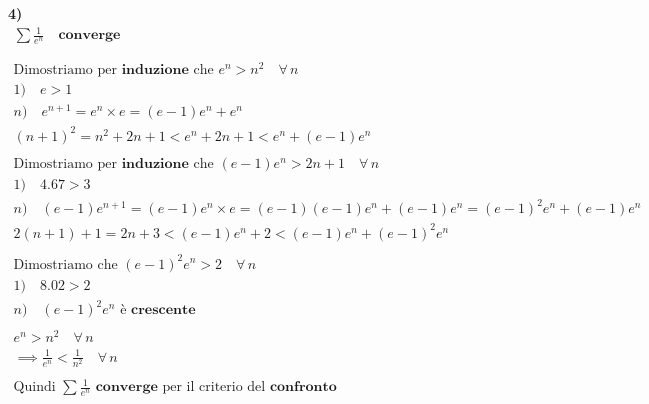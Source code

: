\documentclass[11pt,reqno]{amsart}
\begin{document}
{\bf 4)}
\begin{gather*}
  \sum \frac{1}{e^n} \quad \textbf{converge}\\\\\\
  \text{Dimostriamo per } \textbf{induzione} \text{ che }
  e^n > n^2 \quad \forall \, n\\
  1) \quad e > 1\\
  n) \quad e^{n+1} = e^n \times e = (e-1)e^n + e^n\\
  (n+1)^2 = n^2 + 2n + 1 < e^n + 2n + 1 < e^n + (e-1)e^n\\\\
  \text{Dimostriamo per } \textbf{induzione} \text{ che }
  (e-1)e^n > 2n+1 \quad \forall \, n\\
  1) \quad 4.67 > 3\\
  n) \quad (e-1)e^{n+1} = (e-1)e^n \times e = (e-1)(e-1)e^n + (e-1)e^n = (e-1)^2e^n + (e-1)e^n\\
  2(n+1)+1 = 2n+3 < (e-1)e^n+2 < (e-1)e^n + (e-1)^2e^n\\\\
  \text{Dimostriamo che } (e-1)^2e^n > 2 \quad \forall \, n\\
  1) \quad 8.02 > 2\\
  n) \quad (e-1)^2e^n \text{ è } \textbf{crescente}\\\\
  e^n > n^2 \quad \forall \, n\\
  \implies \frac{1}{e^n} < \frac{1}{n^2} \quad \forall \, n\\\\
  \text{Quindi } \sum \frac{1}{e^n} \textbf{ converge} \text{ per il criterio del } \textbf{confronto}
\end{gather*}
\end{document}
